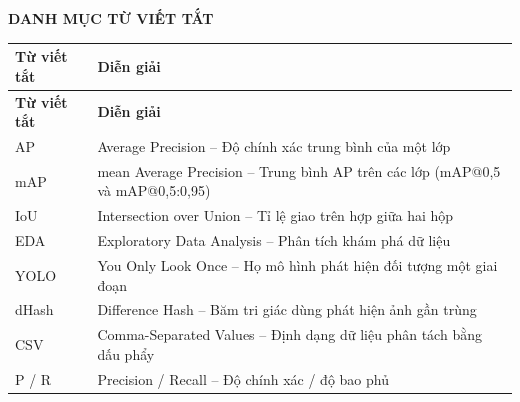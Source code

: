 \newpage
\thispagestyle{plain}

\begin{center}
    {\bfseries\Large DANH MỤC TỪ VIẾT TẮT}
\end{center}

\vspace{0.8cm}

\renewcommand{\arraystretch}{1.25}

\begin{longtable}{>{\centering\arraybackslash}p{3.2cm} p{10.5cm}}
    \toprule
    \textbf{Từ viết tắt} & \textbf{Diễn giải} \\
    \midrule
    \endfirsthead

    \toprule
    \textbf{Từ viết tắt} & \textbf{Diễn giải} \\
    \midrule
    \endhead

    AP & Average Precision -- Độ chính xác trung bình của một lớp \\

    mAP & mean Average Precision -- Trung bình AP trên các lớp (mAP@0,5 và mAP@0,5:0,95) \\

    IoU & Intersection over Union -- Tỉ lệ giao trên hợp giữa hai hộp \\

    EDA & Exploratory Data Analysis -- Phân tích khám phá dữ liệu \\

    YOLO & You Only Look Once -- Họ mô hình phát hiện đối tượng một giai đoạn \\

    dHash & Difference Hash -- Băm tri giác dùng phát hiện ảnh gần trùng \\

    CSV & Comma-Separated Values -- Định dạng dữ liệu phân tách bằng dấu phẩy \\

    P / R & Precision / Recall -- Độ chính xác / độ bao phủ \\

    \bottomrule
\end{longtable}
